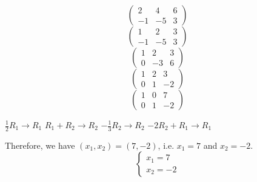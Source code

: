 \documentclass[12pt,letterpaper]{exam}
\begin{document}
\begin{questions}
{\itshape
	\begin{minipage}[t]{0.49\textwidth}
	\[
	\begin{pmatrix}
	2 & 4 & 6 \\
	-1 & -5 & 3
	\end{pmatrix}
	\] \pvspace{1cm}
	\[
	\begin{pmatrix}
	1 & 2 & 3 \\
	-1 & -5 & 3
	\end{pmatrix}
	\] \pvspace{1cm}
	\[
	\begin{pmatrix}
	1 & 2 & 3 \\
	0 & -3 & 6
	\end{pmatrix}
	\] \pvspace{1cm}
	\[
	\begin{pmatrix}
	1 & 2 & 3 \\
	0 & 1 & -2
	\end{pmatrix}
	\] \pvspace{1cm}
	\[
	\begin{pmatrix}
	1 & 0 & 7 \\
	0 & 1 & -2
	\end{pmatrix}
	\]
	\end{minipage}
	\begin{minipage}[t]{0.49\textwidth} \pvspace{0.3cm}
	$\frac{1}{2} R_1 \to R_1$ \pvspace{1.8cm}
	$R_1 + R_2 \to R_2$ \pvspace{1.9cm}
	$-\frac{1}{3}R_2 \to R_2$ \pvspace{1.9cm}
	$-2R_2 + R_1 \to R_1$
	\end{minipage} \pvspace{1.1cm}
Therefore, we have $(x_1, x_2)= (7, -2)$, i.e. $x_1= 7$ and $x_2= -2$. 
	\[
	\begin{cases}
	x_1= 7 \\
	x_2= -2
	\end{cases}
	\]
}


\end{questions}
\end{document}
